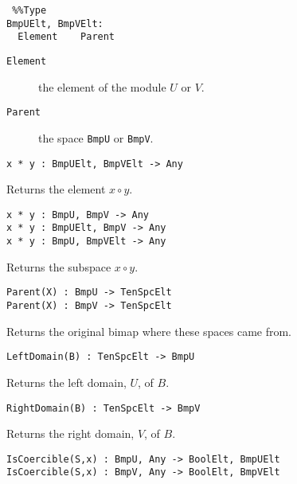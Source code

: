 \documentclass{amsart}
\begin{document}
\color{blue}
{\small \begin{verbatim} %%Type
BmpUElt, BmpVElt:
  Element    Parent
\end{verbatim} }
\color{black}

\begin{description}
\item[{\tt Element}] the element of the module $U$ or $V$.
\item[{\tt Parent}] the space {\tt BmpU} or {\tt BmpV}.
\end{description}

\color{blue}
\index{$*$}
{\small \begin{verbatim}
x * y : BmpUElt, BmpVElt -> Any
\end{verbatim} }
\color{black}

Returns the element $x\circ y$.

\color{blue}
\index{$*$}
{\small \begin{verbatim}
x * y : BmpU, BmpV -> Any
x * y : BmpUElt, BmpV -> Any
x * y : BmpU, BmpVElt -> Any
\end{verbatim} }
\color{black}

Returns the subspace $x\circ y$.

\color{blue}
{\small \begin{verbatim}
Parent(X) : BmpU -> TenSpcElt
Parent(X) : BmpV -> TenSpcElt
\end{verbatim} }
\color{black}

Returns the original bimap where these spaces came from.

\color{blue}
{\small \begin{verbatim}
LeftDomain(B) : TenSpcElt -> BmpU
\end{verbatim} }
\color{black}

Returns the left domain, $U$, of $B$. 

\color{blue}
{\small \begin{verbatim}
RightDomain(B) : TenSpcElt -> BmpV
\end{verbatim} }
\color{black}

Returns the right domain, $V$, of $B$. 

\color{blue}
{\small \begin{verbatim}
IsCoercible(S,x) : BmpU, Any -> BoolElt, BmpUElt
IsCoercible(S,x) : BmpV, Any -> BoolElt, BmpVElt
\end{verbatim} }
\color{black}
\end{document}
